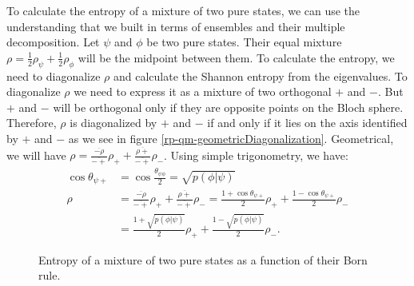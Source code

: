 To calculate the entropy of a mixture of two pure states, we can use the understanding that we built in terms of ensembles and their multiple decomposition. Let $\psi$ and $\phi$ be two pure states. Their equal mixture $\rho=\frac{1}{2}\rho_{\psi} + \frac{1}{2}\rho_{\phi}$ will be the midpoint between them. To calculate the entropy, we need to diagonalize $\rho$ and calculate the Shannon entropy from the eigenvalues. To diagonalize $\rho$ we need to express it as a mixture of two orthogonal $+$ and $-$. But $+$ and $-$ will be orthogonal only if they are opposite points on the Bloch sphere. Therefore, $\rho$ is diagonalized by $+$ and $-$ if and only if it lies on the axis identified by $+$ and $-$ as we see in figure \ref{rp-qm-geometricDiagonalization}. Geometrical, we will have $\rho = \frac{\overline{-\rho}}{\overline{-+}}\rho_{+} + \frac{\overline{\rho+}}{\overline{-+}}\rho_{-}$. Using simple trigonometry, we have:
\begin{equation}
	\begin{aligned}
		\cos \theta_{\psi+} &= \cos \frac{\theta_{\psi\phi}}{2} = \sqrt{p(\phi|\psi)} \\
		\rho &= \frac{\overline{-\rho}}{\overline{-+}}\rho_{+} + \frac{\overline{\rho+}}{\overline{-+}}\rho_{-} = \frac{1+\cos \theta_{\psi+}}{2}\rho_{+} + \frac{1-\cos \theta_{\psi+}}{2}\rho_{-} \\
		&= \frac{1+\sqrt{p(\phi|\psi)}}{2}\rho_{+} + \frac{1-\sqrt{p(\phi|\psi)}}{2}\rho_{-}.
	\end{aligned}
\end{equation}


\begin{figure}
	\centering
	\caption {Entropy of a mixture of two pure states as a function of their Born rule.} \label{fig_rp_qm_entropyVsProb}
\end{figure}


